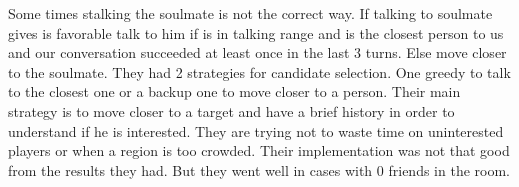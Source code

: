 Some times stalking the soulmate is not the correct way. If talking to soulmate 
gives is favorable talk to him if is in talking range and is the closest person
to us and our conversation succeeded at least once in the last 3 turns. Else
move closer to the soulmate. They had 2 strategies for candidate selection. One 
greedy to talk to the closest one or a backup one to move closer to a person.
Their main strategy is to move closer to a target and have a brief history in 
order to understand if he is interested. They are trying not to waste time on
uninterested players or when a region is too crowded. Their implementation 
was not that good from the results they had. But they went well in cases with
0 friends in the room.

